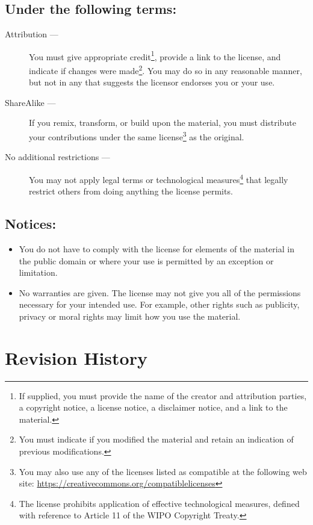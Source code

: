 \documentclass[letterpaper,twoside]{article}
\begin{document}
\subsection{Under the following terms:}
\begin{description}
\item[Attribution ---]You must give appropriate credit\footnote{If supplied,
  you must provide the name of the creator and attribution parties,
  a copyright notice, a license notice, a disclaimer notice, and a link
  to the material.}, provide a link to
  the license, and indicate if changes were made\footnote{You must indicate if
    you modified the material and retain an indication of previous
    modifications.}.  You may do so in any
  reasonable manner, but not in any that suggests the licensor endorses you
  or your use.
\item[ShareAlike ---]If you remix, transform, or build upon the material,
  you must distribute your contributions under the same
  license\footnote{You may also use any of the licenses listed as compatible
    at the following web site:
    \href{https://creativecommons.org/compatiblelicenses}{https://creativecommons.org/compatiblelicenses}}
  as the original.
\item[No additional restrictions ---]You may not apply legal terms or
  technological measures\footnote{The license prohibits application of
    effective technological measures, defined with reference to Article 11
    of the WIPO Copyright Treaty.}
  that legally restrict others from doing anything
  the license permits.
\end{description}
\subsection{Notices:}
\begin{itemize}
\item{You do not have to comply with the license for elements of the
  material in the public domain or where your use is permitted by an
  exception or limitation.}
\item{No warranties are given.  The license may not give you all of the
  permissions necessary for your intended use.  For example, other rights
  such as publicity, privacy or moral rights may limit how you use the
  material.}
\end{itemize}

\section{Revision History}
\end{document}
